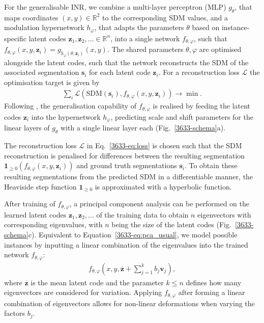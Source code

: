 For the generalisable INR, we combine a multi-layer perceptron (MLP) $g_{\theta}$, that maps coordinates $(x,y)\in\mathbb{R}^{2}$ to the corresponding SDM values, and a modulation hypernetwork $h_{\varphi}$, that adapts the parameters $\theta$ based on instance-specific latent codes $\boldsymbol{z}_{1}, \boldsymbol{z}_{2},\dots\in\mathbb{R}^{n}$, into a single network $f_{\theta,\varphi}$, such that $f_{\theta,\varphi}(x,y,\boldsymbol{z}_{i}) = g_{h_{\varphi}(\theta,\boldsymbol{z}_{i})}(x,y)$. The shared parameters $\theta,\varphi$ are optimised alongside the latent codes, such that the network reconstructs the SDM of the associated segmentation $\boldsymbol{s}_{i}$ for each latent code $\boldsymbol{z}_{i}$. For a reconstruction loss $\mathcal{L}$ the optimisation target is given by
\begin{align}
    \label{3633-eq:loss}
    \sum_{i}\mathcal{L}(\text{SDM}(\boldsymbol{s}_{i}), f_{\theta,\varphi}(x,y,\boldsymbol{z}_{i})) \to \min.
\end{align}
Following \citep{dannecker2024cina}, the generalisation capability of $f_{\theta,\varphi}$ is realised by feeding the latent codes $\boldsymbol{z}_{i}$ into the hypernetwork $h_{\varphi}$, predicting scale and shift parameters for the linear layers of $g_{\theta}$ with a single linear layer each (Fig.~\ref{3633-schema}a).

The reconstruction loss $\mathcal{L}$ in Eq.~\ref{3633-eq:loss} is chosen such that the SDM reconstruction is penalised for differences between the resulting segmentation $\boldsymbol{1}_{\ge 0}(f_{\theta,\varphi}(x,y,\boldsymbol{z}_{i}))$ and ground truth segmentations $\boldsymbol{s}_{i}$. To obtain these resulting segmentations from the predicted SDM in a differentiable manner, the Heaviside step function $\boldsymbol{1}_{\ge 0}$ is approximated with a hyperbolic function. 

After training of $f_{\theta,\varphi}$, a principal component analysis can be performed on the learned latent codes $\boldsymbol{z}_{1}, \boldsymbol{z}_{2}, \dots$ of the training data to obtain $n$ eigenvectors with corresponding eigenvalues, with $n$ being the size of the latent codes (Fig.~\ref{3633-schema}c). Equivalent to Equation~\ref{3633-eq:pca_usual}, we model possible instances by inputting a linear combination of the eigenvalues into the trained network $f_{\theta,\varphi}$:
\begin{align}
    \label{3633-eq:latent_ssm}
    f_{\theta,\varphi}(x,y,\boldsymbol{\overline{z}}+\sum_{j=1}^{k} b_{j}\boldsymbol{v}_{j}),
\end{align}
where $\boldsymbol{\overline{z}}$ is the mean latent code and the parameter $k\leq n$ defines how many eigenvectors are considered for variation.
Applying $f_{\theta,\varphi}$ after forming a linear combination of eigenvectors allows for non-linear deformations when varying the factors $b_{j}$.

